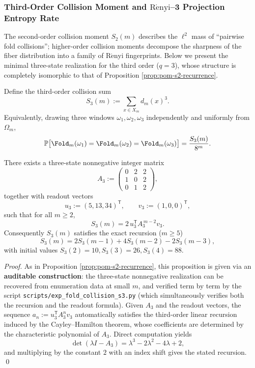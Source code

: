 \subsubsection{Third-Order Collision Moment and \texorpdfstring{$\mathrm{R\acute{e}nyi}$}{Renyi}--3 Projection Entropy Rate}\label{subsec:pom-s3}
The second-order collision moment \(S_2(m)\) describes the \(\ell^2\) mass of ``pairwise fold collisions''; higher-order collision moments decompose the sharpness of the fiber distribution into a family of \(\mathrm{R\acute{e}nyi}\) fingerprints. Below we present the minimal three-state realization for the third order (\(q=3\)), whose structure is completely isomorphic to that of Proposition \ref{prop:pom-s2-recurrence}.

\begin{definition}\label{def:pom-s3}
Define the third-order collision sum
$$
S_3(m):=\sum_{x\in X_m} d_m(x)^3.
$$
Equivalently, drawing three windows \(\omega_1,\omega_2,\omega_3\) independently and uniformly from \(\Omega_m\),
$$
\mathbb{P}\bigl[\Fold_m(\omega_1)=\Fold_m(\omega_2)=\Fold_m(\omega_3)\bigr]=\frac{S_3(m)}{8^m}.
$$
\end{definition}

\begin{proposition}\label{prop:pom-s3-recurrence}
There exists a three-state nonnegative integer matrix
$$
A_3:=
\begin{pmatrix}
0&2&2\\
1&0&2\\
0&1&2
\end{pmatrix},
$$
together with readout vectors
$$
u_3:=(5,13,34)^{\mathsf T},\qquad v_3:=(1,0,0)^{\mathsf T},
$$
such that for all \(m\ge 2\),
$$
S_3(m)=2\,u_3^{\mathsf T}A_3^{\,m-2}v_3.
$$
Consequently \(S_3(m)\) satisfies the exact recursion (\(m\ge 5\))
$$
S_3(m)=2S_3(m-1)+4S_3(m-2)-2S_3(m-3),
$$
with initial values \(S_3(2)=10,S_3(3)=26,S_3(4)=88\).
\end{proposition}
\begin{proof}
As in Proposition \ref{prop:pom-s2-recurrence}, this proposition is given via an \textbf{auditable construction}: the three-state nonnegative realization can be recovered from enumeration data at small \(m\), and verified term by term by the script \texttt{scripts/exp\_fold\_collision\_s3.py} (which simultaneously verifies both the recursion and the readout formula). Given \(A_3\) and the readout vectors, the sequence
\(
a_n:=u_3^{\mathsf T}A_3^{n}v_3
\)
automatically satisfies the third-order linear recursion induced by the Cayley--Hamilton theorem, whose coefficients are determined by the characteristic polynomial of \(A_3\). Direct computation yields
$$
\det(\lambda I-A_3)=\lambda^3-2\lambda^2-4\lambda+2,
$$
and multiplying by the constant \(2\) with an index shift gives the stated recursion. \qed
\end{proof}

